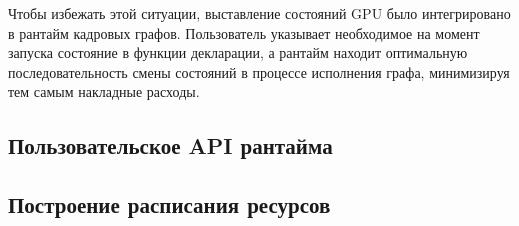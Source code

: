 Чтобы избежать этой ситуации, выставление состояний GPU было интегрировано в рантайм кадровых графов.
Пользователь указывает необходимое на момент запуска состояние в функции декларации, а рантайм находит оптимальную последовательность смены состояний в процессе исполнения графа, минимизируя тем самым накладные расходы.

\subsection{Пользовательское API рантайма}

\subsection{Построение расписания ресурсов}
